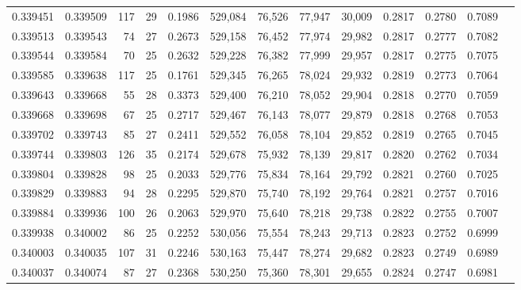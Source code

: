 \begin{tabular}{rrrrrrrrrrrrr}
0.339451 & 0.339509 &   117 &  29 &                                     0.1986 & 529,084 &  76,526 &  77,947 &  30,009 & 0.2817 & 0.2780 & 0.7089 \\
0.339513 & 0.339543 &    74 &  27 &                                     0.2673 & 529,158 &  76,452 &  77,974 &  29,982 & 0.2817 & 0.2777 & 0.7082 \\
0.339544 & 0.339584 &    70 &  25 &                                     0.2632 & 529,228 &  76,382 &  77,999 &  29,957 & 0.2817 & 0.2775 & 0.7075 \\
0.339585 & 0.339638 &   117 &  25 &                                     0.1761 & 529,345 &  76,265 &  78,024 &  29,932 & 0.2819 & 0.2773 & 0.7064 \\
0.339643 & 0.339668 &    55 &  28 &                                     0.3373 & 529,400 &  76,210 &  78,052 &  29,904 & 0.2818 & 0.2770 & 0.7059 \\
0.339668 & 0.339698 &    67 &  25 &                                     0.2717 & 529,467 &  76,143 &  78,077 &  29,879 & 0.2818 & 0.2768 & 0.7053 \\
0.339702 & 0.339743 &    85 &  27 &                                     0.2411 & 529,552 &  76,058 &  78,104 &  29,852 & 0.2819 & 0.2765 & 0.7045 \\
0.339744 & 0.339803 &   126 &  35 &                                     0.2174 & 529,678 &  75,932 &  78,139 &  29,817 & 0.2820 & 0.2762 & 0.7034 \\
0.339804 & 0.339828 &    98 &  25 &                                     0.2033 & 529,776 &  75,834 &  78,164 &  29,792 & 0.2821 & 0.2760 & 0.7025 \\
0.339829 & 0.339883 &    94 &  28 &                                     0.2295 & 529,870 &  75,740 &  78,192 &  29,764 & 0.2821 & 0.2757 & 0.7016 \\
0.339884 & 0.339936 &   100 &  26 &                                     0.2063 & 529,970 &  75,640 &  78,218 &  29,738 & 0.2822 & 0.2755 & 0.7007 \\
0.339938 & 0.340002 &    86 &  25 &                                     0.2252 & 530,056 &  75,554 &  78,243 &  29,713 & 0.2823 & 0.2752 & 0.6999 \\
0.340003 & 0.340035 &   107 &  31 &                                     0.2246 & 530,163 &  75,447 &  78,274 &  29,682 & 0.2823 & 0.2749 & 0.6989 \\
0.340037 & 0.340074 &    87 &  27 &                                     0.2368 & 530,250 &  75,360 &  78,301 &  29,655 & 0.2824 & 0.2747 & 0.6981 \\

\end{tabular}
